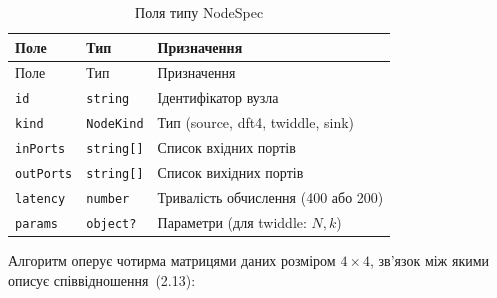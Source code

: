 \documentclass[
]{article}
\newcommand{\passthrough}[1]{#1}
\begin{document}
\begin{longtable}[]{@{}
  >{\raggedright\arraybackslash}p{}
  >{\raggedright\arraybackslash}p{}
  >{\raggedright\arraybackslash}p{}@{}}
\caption[Поля типу NodeSpec]{Поля типу NodeSpec}\tabularnewline
\toprule\noalign{}
\begin{minipage}[b]{\linewidth}\raggedright
Поле
\end{minipage} & \begin{minipage}[b]{\linewidth}\raggedright
Тип
\end{minipage} & \begin{minipage}[b]{\linewidth}\raggedright
Призначення
\end{minipage} \\
\midrule\noalign{}
\endfirsthead
\toprule\noalign{}
\begin{minipage}[b]{\linewidth}\raggedright
Поле
\end{minipage} & \begin{minipage}[b]{\linewidth}\raggedright
Тип
\end{minipage} & \begin{minipage}[b]{\linewidth}\raggedright
Призначення
\end{minipage} \\
\midrule\noalign{}
\endhead
\bottomrule\noalign{}
\endlastfoot
\passthrough{\lstinline!id!} & \passthrough{\lstinline!string!} &
Ідентифікатор вузла \\
\passthrough{\lstinline!kind!} & \passthrough{\lstinline!NodeKind!} &
Тип (source, dft4, twiddle, sink) \\
\passthrough{\lstinline!inPorts!} & \passthrough{\lstinline!string[]!} &
Список вхідних портів \\
\passthrough{\lstinline!outPorts!} & \passthrough{\lstinline!string[]!}
& Список вихідних портів \\
\passthrough{\lstinline!latency!} & \passthrough{\lstinline!number!} &
Тривалість обчислення (400 або 200) \\
\passthrough{\lstinline!params!} & \passthrough{\lstinline!object?!} &
Параметри (для twiddle: \(N,k\)) \\
\end{longtable}

Алгоритм оперує чотирма матрицями даних розміром \(4 \times 4\), зв'язок
між якими описує співвідношення~(2.13):
\end{document}
